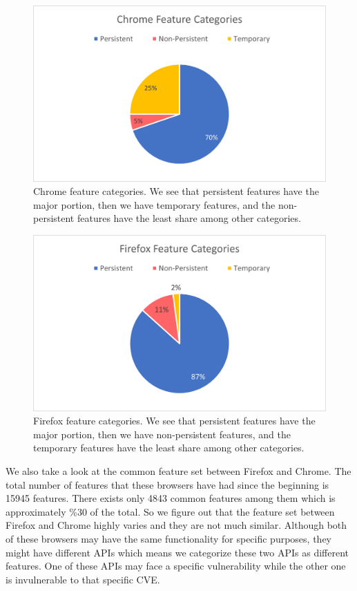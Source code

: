 \begin{figure}[ht]
    \centering
    \includegraphics[width=\columnwidth]{figures/chrome-feature-categories.png}
    \caption{Chrome feature categories. We see that persistent features have the major portion, then we have temporary features, and the non-persistent features have the least share among other categories.}
    \label{fig:chrome-categories}
\end{figure}

\begin{figure}[ht]
    \centering
    \includegraphics[width=\columnwidth]{figures/firefox-feature-categories.png}
    \caption{Firefox feature categories. We see that persistent features have the major portion, then we have non-persistent features, and the temporary features have the least share among other categories.}
    \label{fig:firefox-categories}
\end{figure}

We also take a look at the common feature set between Firefox and Chrome. The total number of features that these browsers have had since the beginning is 15945 features. There exists only 4843 common features among them which is approximately \%30 of the total. So we figure out that the feature set between Firefox and Chrome highly varies and they are not much similar. Although both of these browsers may have the same functionality for specific purposes, they might have different APIs which means we categorize these two APIs as different features. One of these APIs may face a specific vulnerability while the other one is invulnerable to that specific CVE.


